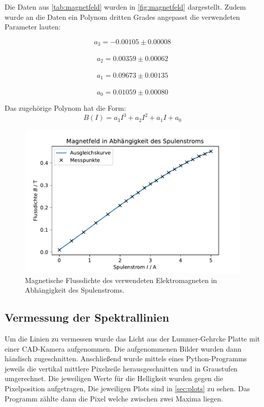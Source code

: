 \FloatBarrier
    Die Daten aus \autoref{tab:magnetfeld} wurden in \autoref{fig:magnetfeld} dargestellt. Zudem wurde 
    an die Daten ein Polynom dritten Grades angepasst die verwendeten Parameter lauten:
    \begin{center}
        $$a_3 = -0.00105 \pm 0.00008$$\\
        $$a_2 =  0.00359 \pm 0.00062$$\\
        $$a_1 =  0.09673 \pm 0.00135$$\\
        $$a_0 =  0.01059 \pm 0.00080$$
    \end{center}
    Das zugehörige Polynom hat die Form:
    \begin{equation*}
      B(I)=a_3I^3+a_2I^2+a_1I+a_0
    \end{equation*}

    \begin{figure}
        \centering
        \includegraphics[width=1\textwidth]{content/grafiken/magnetfeld.pdf}
        \caption{Magnetische Flussdichte des verwendeten Elektromagneten in Abhängigkeit des Spulenstroms.}
        \label{fig:magnetfeld}
      \end{figure}
\subsection{Vermessung der Spektrallinien}
\label{sec:linien}
Um die Linien zu vermessen wurde das Licht aus der Lummer-Gehrcke Platte mit einer CAD-Kamera
aufgenommen. Die aufgenommenen Bilder wurden dann händisch zugeschnitten. 
Anschließend wurde mittels eines Python-Programms jeweils die  vertikal mittlere
Pixelzeile herausgeschnitten und in Graustufen umgerechnet. Die jeweiligen Werte für die Helligkeit wurden 
gegen die Pixelposition aufgetragen, Die jeweiligen Plots sind in \autoref{sec:plots} zu sehen.  Das Programm 
zählte dann die  Pixel welche zwischen zwei Maxima liegen. 
\FloatBarrier
